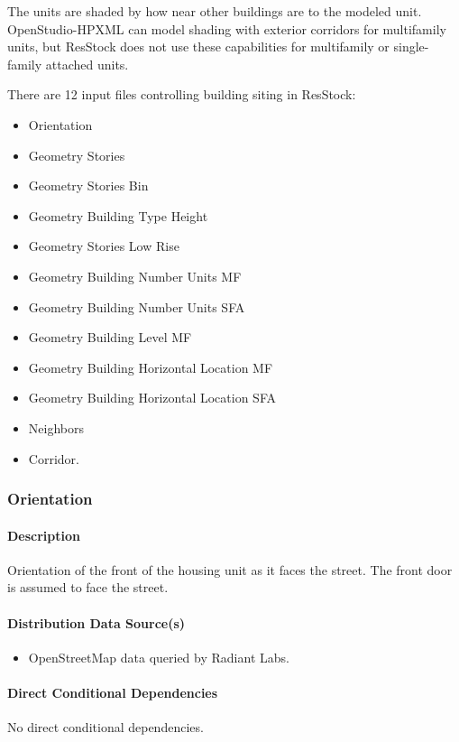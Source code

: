 The units are shaded by how near other buildings are to the modeled unit.  OpenStudio-HPXML can model shading with exterior corridors for multifamily units, but ResStock does not use these capabilities for multifamily or single-family attached units.

There are 12 input files controlling building siting in ResStock:

\begin{itemize}
    \item Orientation
    \item Geometry Stories
    \item Geometry Stories Bin
    \item Geometry Building Type Height
    \item Geometry Stories Low Rise
    \item Geometry Building Number Units MF
    \item Geometry Building Number Units SFA
    \item Geometry Building Level MF
    \item Geometry Building Horizontal Location MF
    \item Geometry Building Horizontal Location SFA
    \item Neighbors
    \item Corridor.

\end{itemize}

\subsubsection{Orientation} \label{sec:orientation}
\paragraph{Description}
Orientation of the front of the housing unit as it faces the street. The front door is assumed to face the street.

\paragraph{Distribution Data Source(s)}
\begin{itemize}
    \item OpenStreetMap data queried by Radiant Labs.
\end{itemize}

\paragraph{Direct Conditional Dependencies}
No direct conditional dependencies.

